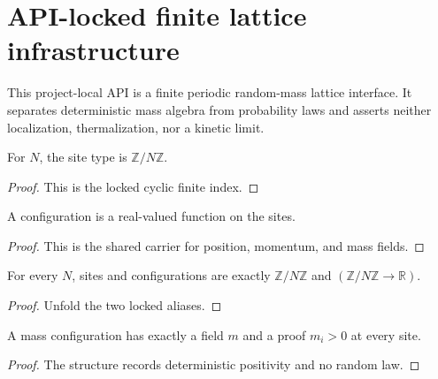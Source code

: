 
\chapter{API-locked finite lattice infrastructure}
\label{ch:ArchonPhysics_Lattice}

This project-local API is a finite periodic random-mass lattice interface. It separates deterministic mass algebra from probability laws and asserts neither localization, thermalization, nor a kinetic limit.

\begin{definition}\leanok
[Sites]
\label{def:lattice:site}
For $N$, the site type is $\mathbb Z/N\mathbb Z$.
\end{definition}
\begin{proof}\leanok
This is the locked cyclic finite index.\end{proof}

\begin{definition}\leanok
[Configurations]
\label{def:lattice:configuration}
A configuration is a real-valued function on the sites.
\end{definition}
\begin{proof}\leanok
This is the shared carrier for position, momentum, and mass fields.\end{proof}

\begin{theorem}
\label{thm:lattice:site-configuration}
For every $N$, sites and configurations are exactly $\mathbb Z/N\mathbb Z$ and $(\mathbb Z/N\mathbb Z\to\mathbb R)$.
\end{theorem}
\begin{proof}\leanok
Unfold the two locked aliases.\end{proof}

\begin{definition}
\label{def:lattice:positive-mass-config}
A mass configuration has exactly a field $m$ and a proof $m_i>0$ at every site.
\end{definition}
\begin{proof}\leanok
The structure records deterministic positivity and no random law.\end{proof}

